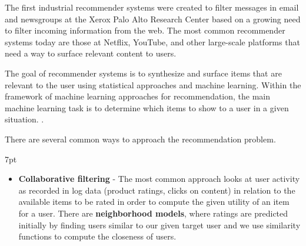 \documentclass[11pt, table]{diazessay} %
\newenvironment{formal}{%
  \def\FrameCommand{%
    \hspace{1pt}%
    {\color{w_lightblue}\vrule width 2pt}%
    {\color{formalshade}\vrule width 4pt}%
    \colorbox{formalshade}%
  }%
  \MakeFramed{\advance\hsize-\width\FrameRestore}%
  \noindent\hspace{-4.55pt}%
  \begin{adjustwidth}{}{7pt}%
  \vspace{2pt}\vspace{2pt}%
}
{%
  \vspace{2pt}\end{adjustwidth}\endMakeFramed%
}
\begin{document}
\begin{sloppypar}
The first industrial recommender systems were created to filter messages in email and newsgroups\citep{goldberg1992using}  at the Xerox Palo Alto Research Center based on a growing need to filter incoming information from the web.  The most common recommender systems today are those at Netflix, YouTube, and other large-scale platforms that need a way to surface relevant content to users. 

The goal of recommender systems is to synthesize and surface items that are relevant to the user using statistical approaches and machine learning. Within the framework of machine learning approaches for recommendation, the main machine learning task is to determine which items to show to a user in a given situation. \citep{castells2023recommender}.

There are several common ways to approach the recommendation problem. 

\begin{formal}
\begin{itemize}

  \item \textbf{Collaborative filtering} - The most common approach looks at user activity as recorded in log data (product ratings, clicks on content) in relation to the available items to be rated in order to compute the given utility of an item for a user. There are \textbf{neighborhood models}, where ratings are predicted initially by finding users similar to our given target user and we use similarity functions to compute the closeness of users. 
  

\end{itemize}
\end{formal}
\end{sloppypar}
\end{document}
